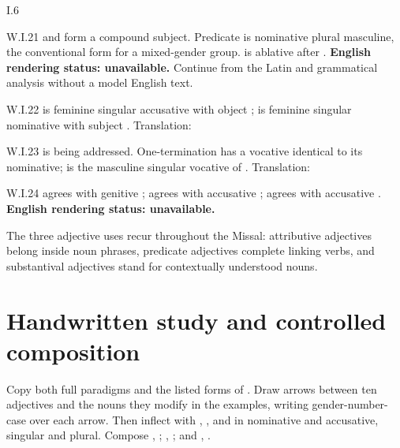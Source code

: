 \begin{courseunit}{I.6}
\begin{workedexample}{}{W.I.21}
 and  form a compound subject. Predicate
 is nominative plural masculine, the conventional form for a
mixed-gender group.  is ablative after .
\textbf{English rendering status: unavailable.} Continue from the Latin and
grammatical analysis without a model English text.
\end{workedexample}

\begin{workedexample}{}{W.I.22}
 is feminine singular accusative with object ;
 is feminine singular nominative with subject .
Translation: 
\end{workedexample}

\begin{workedexample}{}{W.I.23}
 is being addressed. One-termination  has a
vocative identical to its nominative;  is the masculine
singular vocative of . Translation: 
\end{workedexample}

\begin{workedexample}{}{W.I.24}
 agrees with genitive ;  agrees with
accusative ;  agrees with accusative
. \textbf{English rendering status: unavailable.}
\end{workedexample}

The three adjective uses recur throughout the Missal: attributive adjectives
belong inside noun phrases, predicate adjectives complete linking verbs, and
substantival adjectives stand for contextually understood nouns.

\section{Handwritten study and controlled composition}

Copy both full paradigms and the listed forms of . Draw arrows
between ten adjectives and the nouns they modify in the examples, writing
gender-number-case over each arrow. Then inflect  with
, , and  in nominative and
accusative, singular and plural. Compose ,
; ,
; and ,
.



\end{courseunit}

